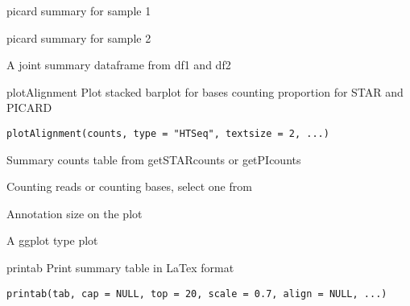 \documentclass[letterpaper]{book}
\begin{document}
%
\begin{Arguments}
\begin{ldescription}
\item[\code{df1}] picard summary for sample 1

\item[\code{df2}] picard summary for sample 2
\end{ldescription}
\end{Arguments}
%
\begin{Value}
A joint summary dataframe from df1 and df2
\end{Value}
%
\begin{Description}\relax
plotAlignment
Plot stacked barplot for bases counting proportion for STAR and PICARD
\end{Description}
%
\begin{Usage}
\begin{verbatim}
plotAlignment(counts, type = "HTSeq", textsize = 2, ...)
\end{verbatim}
\end{Usage}
%
\begin{Arguments}
\begin{ldescription}
\item[\code{counts}] Summary counts table from getSTARcounts or getPIcounts

\item[\code{type}] Counting reads or counting bases, select one from 

\item[\code{textsize}] Annotation size on the plot
\end{ldescription}
\end{Arguments}
%
\begin{Value}
A ggplot type plot
\end{Value}
%
\begin{Description}\relax
printab
Print summary table in LaTex format
\end{Description}
%
\begin{Usage}
\begin{verbatim}
printab(tab, cap = NULL, top = 20, scale = 0.7, align = NULL, ...)
\end{verbatim}
\end{Usage}
%
\end{document}
